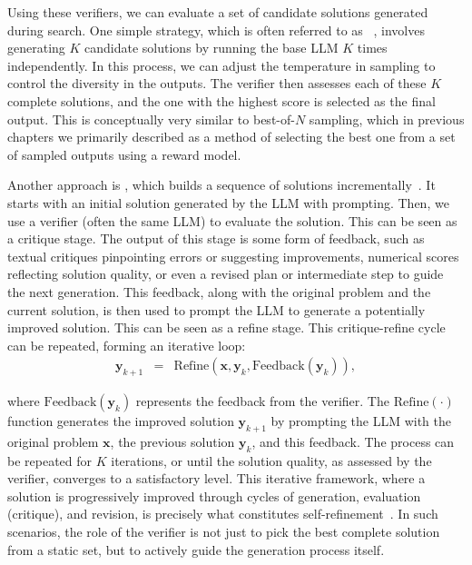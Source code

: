 Using these verifiers, we can evaluate a set of candidate solutions generated during search. One simple strategy, which is often referred to as ~\cite{brown-etal:2024large,snell-etal:2024scaling}, involves generating $K$ candidate solutions by running the base LLM $K$ times independently.  In this process, we can adjust the temperature in sampling to control the diversity in the outputs. The verifier then assesses each of these $K$ complete solutions, and the one with the highest score is selected as the final output. This is conceptually very similar to best-of-$N$ sampling, which in previous chapters we primarily described as a method of selecting the best one from a set of sampled outputs using a reward model.

Another approach is , which builds a sequence of solutions incrementally~\cite{gou-etal:2024critic,zhang-etal:2024small}. It starts with an initial solution generated by the LLM with prompting. Then, we use a verifier (often the same LLM) to evaluate the solution. This can be seen as a critique stage. The output of this stage is some form of feedback, such as textual critiques pinpointing errors or suggesting improvements, numerical scores reflecting solution quality, or even a revised plan or intermediate step to guide the next generation. This feedback, along with the original problem and the current solution, is then used to prompt the LLM to generate a potentially improved solution. This can be seen as a refine stage. This critique-refine cycle can be repeated, forming an iterative loop:
\begin{eqnarray}
\mathbf{y}_{k+1} & = & \mathrm{Refine}(\mathbf{x}, \mathbf{y}_k, \mathrm{Feedback}(\mathbf{y}_k)),
\end{eqnarray}

\noindent where $\mathrm{Feedback}(\mathbf{y}_k)$ represents the feedback from the verifier. The $\mathrm{Refine}(\cdot)$ function generates the improved solution $\mathbf{y}_{k+1}$ by prompting the LLM with the original problem $\mathbf{x}$, the previous solution $\mathbf{y}_k$, and this feedback. The process can be repeated for $K$ iterations, or until the solution quality, as assessed by the verifier, converges to a satisfactory level. This iterative framework, where a solution is progressively improved through cycles of generation, evaluation (critique), and revision, is precisely what constitutes self-refinement~\cite{shinn-etal:2023reflexion,madaan-etal:2024self}. In such scenarios, the role of the verifier is not just to pick the best complete solution from a static set, but to actively guide the generation process itself.

